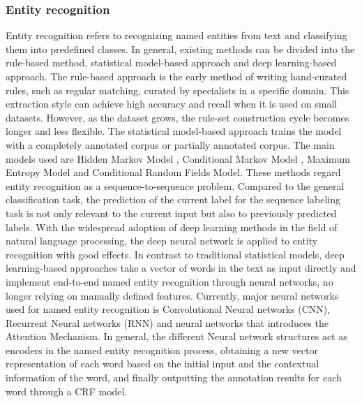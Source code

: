 \documentclass[%
 aip,
 jmp,%
 amsmath,amssymb,
 reprint,%
]{revtex4-2}
\begin{document}
\subsubsection{Entity recognition}
Entity recognition refers to recognizing named entities from text and classifying them into predefined classes\cite{al2020named}.
In general, existing methods can be divided into the rule-based method, statistical model-based approach and 
deep learning-based approach.
The rule-based approach is the early method of writing hand-curated rules, such as regular matching\cite{reiss2008algebraic, li2008regular}, curated by specialists in a specific domain\cite{ratner2020snorkel}. This extraction style can achieve high accuracy and recall when it is used on small datasets. However, as the dataset grows, the rule-set construction cycle becomes longer and less flexible\cite{alfred2014malay}.
The statistical model-based approach trains the model with a completely annotated corpus or partially annotated corpus.
The main models used are Hidden Markov Model \cite{fine1998hierarchical}, Conditional Markov Model \cite{cook2004conditional}, 
Maximum Entropy Model \cite{ratnaparkhi1996maximum} and Conditional Random Fields Model\cite{wallach2004conditional}. 
These methods regard entity recognition as a sequence-to-sequence problem\cite{sutskever2014sequence, clark2017vinet}. Compared to the general classification task\cite{teufel1997sentence}, the prediction of the current label for the sequence labeling task\cite{nguyen2007comparisons} is not only relevant to the current input but also to previously predicted labels.  
With the widespread adoption of deep learning methods in the field of natural language processing, the deep neural network is applied to entity recognition with good effects. In contrast to traditional statistical models, deep learning-based approaches take a vector of words in the text as input directly and implement end-to-end named entity recognition\cite{yadav2020end} through neural networks, no longer relying on manually defined features.
Currently, major neural networks used for named entity
recognition is Convolutional Neural networks (CNN)\cite{o2015introduction}, Recurrent Neural networks (RNN) \cite{medsker2001recurrent} and neural networks that introduces the Attention Mechanism\cite{tilk2016bidirectional}. In general, the different Neural network structures act as encoders in the named entity recognition process, obtaining a new vector representation of each word based on the initial input and the contextual information of the word\cite{bojanowski2017enriching, schutze1992word}, and finally outputting the annotation results for each word through a CRF model\cite{li2019drug}.
\end{document}
